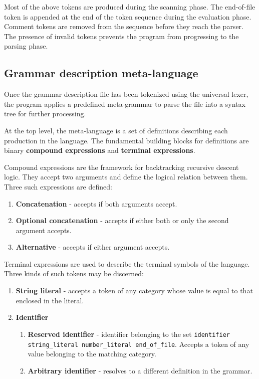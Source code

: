 \documentclass{article}
\begin{document}
	Most of the above tokens are produced during the scanning phase. The
	end-of-file token is appended at the end of the token sequence during the
	evaluation phase. Comment tokens are removed from the sequence before they
	reach the parser. The presence of invalid tokens prevents the program from
	progressing to the parsing phase.

	\subsection{Grammar description meta-language}

	Once the grammar description file has been tokenized using the universal
	lexer, the program applies a predefined meta-grammar to parse the file into
	a syntax tree for further processing.

	At the top level, the meta-language is a set of definitions describing each
	production in the language. The fundamental building blocks for definitions
	are binary \textbf{compound expressions} and \textbf{terminal expressions}.

	Compound expressions are the framework for backtracking recursive descent
	logic. They accept two arguments and define the logical relation between
	them. Three such expressions are defined:

	\begin{enumerate}
		\item \textbf{Concatenation} - accepts if both arguments accept.
		\item \textbf{Optional concatenation} - accepts if either both or only
		the second argument accepts.
		\item \textbf{Alternative} - accepts if either argument accepts.
	\end{enumerate}

	Terminal expressions are used to describe the terminal symbols of the
	language. Three kinds of such tokens may be discerned:

	\begin{enumerate}
		\item \textbf{String literal} - accepts a token of any category whose
		value is equal to that enclosed in the literal.
		\item \textbf{Identifier}
		\begin{enumerate}
			\item \textbf{Reserved identifier} - identifier belonging to the set \texttt{identifier string\_literal number\_literal end\_of\_file}.
			Accepts a token of any value belonging to the matching category.
			\item \textbf{Arbitrary identifier} - resolves to a different definition in the grammar.
		\end{enumerate}
	\end{enumerate}
\end{document}
